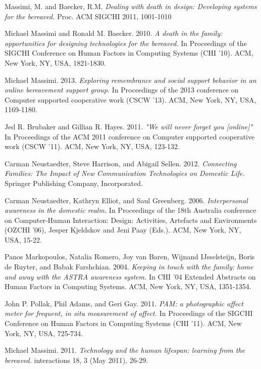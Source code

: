 \begin{thebibliography}{9}

  Massimi, M. and Baecker, R.M.
  \emph{Dealing with death in design: Developing systems for the bereaved.}
  Proc. ACM SIGCHI 2011, 1001-1010

  Michael Massimi and Ronald M. Baecker.
  2010.
  \emph{A death in the family: opportunities for designing technologies for the
  bereaved.}
  In Proceedings of the SIGCHI Conference on Human Factors in Computing
  Systems (CHI '10).
  ACM, New York, NY, USA, 1821-1830. 

  Michael Massimi.
  2013.
  \emph{Exploring remembrance and social support behavior in an online
  bereavement support group.}
  In Proceedings of the 2013 conference on Computer supported cooperative
  work (CSCW '13). ACM, New York, NY, USA, 1169-1180. 

  Jed R. Brubaker and Gillian R. Hayes.
  2011.
  \emph{"We will never forget you [online]"}
  In Proceedings of the ACM 2011 conference on Computer supported cooperative
  work
  (CSCW '11). ACM, New York, NY, USA, 123-132. 

  Carman Neustaedter, Steve Harrison, and Abigail Sellen.
  2012.
  \emph{Connecting Families: The Impact of New Communication Technologies on
  Domestic Life.}
  Springer Publishing Company, Incorporated.

  Carman Neustaedter, Kathryn Elliot, and Saul Greenberg.
  2006.
  \emph{Interpersonal awareness in the domestic realm.}
  In Proceedings of the 18th Australia conference on Computer-Human Interaction:
  Design: Activities, Artefacts and Environments (OZCHI '06),
  Jesper Kjeldskov and Jeni Paay (Eds.). ACM, New York, NY, USA, 15-22.

  Panos Markopoulos, Natalia Romero, Joy van Baren, Wijnand IJsselsteijn,
  Boris de Ruyter, and Babak Farshchian.
  2004.
  \emph{Keeping in touch with the family: home and away with the ASTRA awareness
  system.}
  In CHI '04 Extended Abstracts on Human Factors in Computing Systems.
  ACM, New York, NY, USA, 1351-1354.

  John P. Pollak, Phil Adams, and Geri Gay.
  2011.
  \emph{PAM: a photographic affect meter for frequent, in situ measurement of
  affect.}
  In Proceedings of the SIGCHI Conference on Human Factors in Computing Systems
  (CHI '11). ACM, New York, NY, USA, 725-734. 

  Michael Massimi.
  2011.
  \emph{Technology and the human lifespan: learning from the bereaved.}
  interactions 18, 3 (May 2011), 26-29.

\end{thebibliography}
